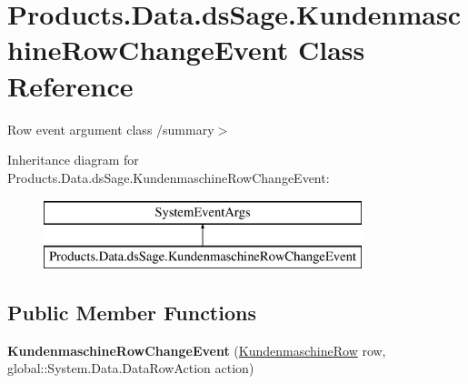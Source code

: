 \hypertarget{class_products_1_1_data_1_1ds_sage_1_1_kundenmaschine_row_change_event}{}\section{Products.\+Data.\+ds\+Sage.\+Kundenmaschine\+Row\+Change\+Event Class Reference}
\label{class_products_1_1_data_1_1ds_sage_1_1_kundenmaschine_row_change_event}


Row event argument class /summary$>$  


Inheritance diagram for Products.\+Data.\+ds\+Sage.\+Kundenmaschine\+Row\+Change\+Event\+:\begin{figure}[H]
\begin{center}
\leavevmode
\includegraphics[height=2.000000cm]{class_products_1_1_data_1_1ds_sage_1_1_kundenmaschine_row_change_event}
\end{center}
\end{figure}
\subsection*{Public Member Functions}
\begin{DoxyCompactItemize}
\item 
{\bfseries Kundenmaschine\+Row\+Change\+Event} (\hyperlink{class_products_1_1_data_1_1ds_sage_1_1_kundenmaschine_row}{Kundenmaschine\+Row} row, global\+::\+System.\+Data.\+Data\+Row\+Action action)\hypertarget{class_products_1_1_data_1_1ds_sage_1_1_kundenmaschine_row_change_event_ad8f26bb8d7c59a86544862ecb1ddb645}{}\label{class_products_1_1_data_1_1ds_sage_1_1_kundenmaschine_row_change_event_ad8f26bb8d7c59a86544862ecb1ddb645}

\end{DoxyCompactItemize}
